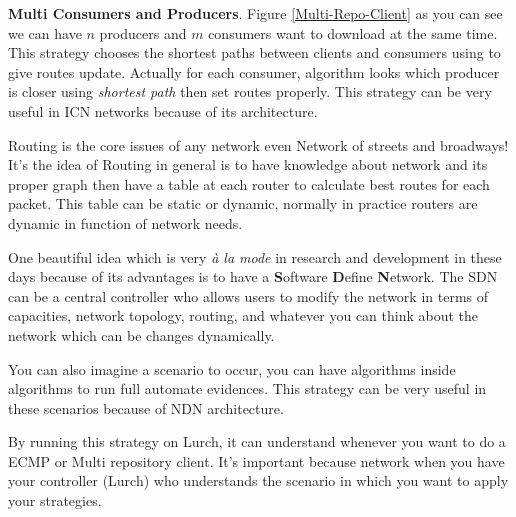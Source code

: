\textbf{\Large{Multi Consumers and Producers}}. Figure \ref{Multi-Repo-Client} as you can see we can have $n$ producers and $m$ consumers want to download at the same time. This strategy chooses the shortest paths between clients and consumers using to give routes update. Actually for each consumer, algorithm looks which producer is closer using \textit{shortest path} then set routes properly. This strategy can be very useful in ICN networks because of its architecture. 

Routing is the core issues of any network even Network of streets and broadways! It's the idea of Routing in general is to have knowledge about network and its proper graph then have a table at each router to calculate best routes for each packet. This table can be static or dynamic, normally in practice routers are dynamic in function of network needs. 

One beautiful idea which is very \textit{à la mode} in research and development in these days because of its advantages is to have a \textbf{S}oftware \textbf{D}efine \textbf{N}etwork. The SDN can be a central controller who allows users to modify the network in terms of capacities, network topology, routing, and whatever you can think about the network which can be changes dynamically.

You can also imagine a scenario to occur, you can have algorithms inside algorithms to run full automate evidences. This strategy can be very useful in these scenarios because of NDN architecture.

By running this strategy on Lurch, it can understand whenever you want to do a ECMP or Multi repository client. It's important because network when you have your controller (Lurch) who understands the scenario in which you want to apply your strategies. 

  


